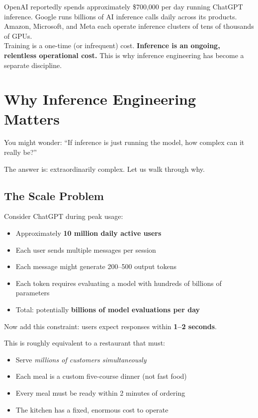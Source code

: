 \documentclass[12pt, twoside, openright]{book}
\begin{document}
\begin{notebox}
OpenAI reportedly spends approximately \$700,000 per day running
ChatGPT inference. Google runs billions of AI inference calls daily
across its products. Amazon, Microsoft, and Meta each operate
inference clusters of tens of thousands of GPUs.\\[4pt]
Training is a one-time (or infrequent) cost.
\textbf{Inference is an ongoing, relentless operational cost.}
This is why inference engineering has become a separate discipline.
\end{notebox}

\section{Why Inference Engineering Matters}

You might wonder: ``If inference is just running the model,
how complex can it really be?''

The answer is: extraordinarily complex. Let us walk through why.

\subsection{The Scale Problem}

Consider ChatGPT during peak usage:
\begin{itemize}
  \item Approximately \textbf{10 million daily active users}
  \item Each user sends multiple messages per session
  \item Each message might generate 200--500 output tokens
  \item Each token requires evaluating a model with hundreds of billions
        of parameters
  \item Total: potentially \textbf{billions of model evaluations per day}
\end{itemize}

Now add this constraint: users expect responses within \textbf{1--2 seconds}.

This is roughly equivalent to a restaurant that must:
\begin{itemize}
  \item Serve \textit{millions of customers simultaneously}
  \item Each meal is a custom five-course dinner (not fast food)
  \item Every meal must be ready within 2 minutes of ordering
  \item The kitchen has a fixed, enormous cost to operate
\end{itemize}
\end{document}

